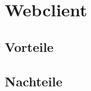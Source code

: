 \documentclass[11pt,oneside,a4paper,notitlepage]{article}
\begin{document}
%
\section{Webclient }
%

%
\subsection*{Vorteile}

%
\subsection*{Nachteile}


%
\end{document}
